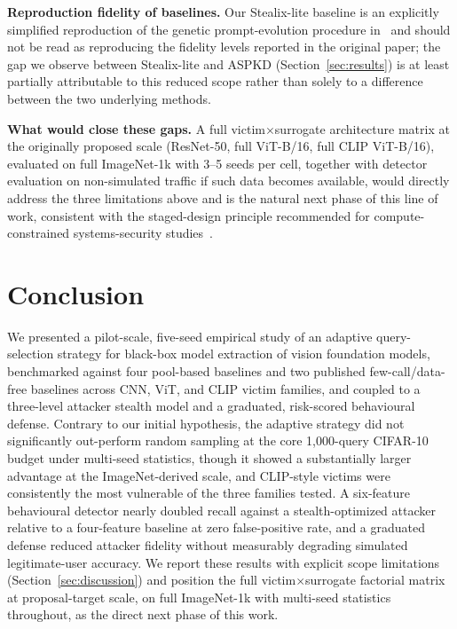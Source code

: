 \documentclass[journal,10pt]{IEEEtran}
\begin{document}
\textbf{Reproduction fidelity of baselines.} Our Stealix-lite baseline is an explicitly simplified
reproduction of the genetic prompt-evolution procedure in~\cite{zhuang2025stealix} and should not
be read as reproducing the fidelity levels reported in the original paper; the gap we observe
between Stealix-lite and ASPKD (Section~\ref{sec:results}) is at least partially attributable to
this reduced scope rather than solely to a difference between the two underlying methods.

\textbf{What would close these gaps.} A full victim$\times$surrogate architecture matrix at the
originally proposed scale (ResNet-50, full ViT-B/16, full CLIP ViT-B/16), evaluated on full
ImageNet-1k with 3--5 seeds per cell, together with detector evaluation on non-simulated traffic if
such data becomes available, would directly address the three limitations above and is the natural
next phase of this line of work, consistent with the staged-design principle recommended for
compute-constrained systems-security studies~\cite{oliynyk2023survey}.

\section{Conclusion}
\label{sec:conclusion}

We presented a pilot-scale, five-seed empirical study of an adaptive query-selection strategy for
black-box model extraction of vision foundation models, benchmarked against four pool-based
baselines and two published few-call/data-free baselines across CNN, ViT, and CLIP victim
families, and coupled to a three-level attacker stealth model and a graduated, risk-scored
behavioural defense. Contrary to our initial hypothesis, the adaptive strategy did not
significantly out-perform random sampling at the core 1{,}000-query CIFAR-10 budget under
multi-seed statistics, though it showed a substantially larger advantage at the ImageNet-derived
scale, and CLIP-style victims were consistently the most vulnerable of the three families tested.
A six-feature behavioural detector nearly doubled recall against a stealth-optimized attacker
relative to a four-feature baseline at zero false-positive rate, and a graduated defense reduced
attacker fidelity without measurably degrading simulated legitimate-user accuracy. We report these
results with explicit scope limitations (Section~\ref{sec:discussion}) and position the full
victim$\times$surrogate factorial matrix at proposal-target scale, on full ImageNet-1k with
multi-seed statistics throughout, as the direct next phase of this work.
\end{document}
